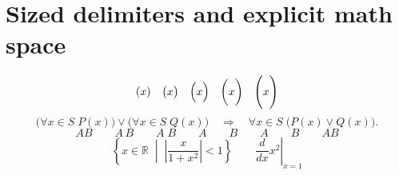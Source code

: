 \documentclass[11pt]{article}
\begin{document}
\pagestyle{empty}
\section*{Sized delimiters and explicit math space}
\[
(x)\quad\bigl(x\bigr)\quad\Bigl(x\Bigr)\quad
\biggl(x\biggr)\quad\Biggl(x\Biggr)
\]
\[
\bigl(\forall x\in S\;P(x)\bigr)\vee
\bigl(\forall x\in S\;Q(x)\bigr)
\quad\Longrightarrow\quad
\forall x\in S\;\bigl(P(x)\vee Q(x)\bigr).
\]
\[
A B\qquad A\,B\qquad A\;B\qquad A\qquad B\qquad
A\qquad B\qquad A\!B
\]
\[
\left\{x\in\mathbb{R}\;\middle|\;
\left|\frac{x}{1+x^2}\right|<1\right\}
\qquad
\left.\frac{d}{dx}x^2\right|_{x=1}
\]
\end{document}
